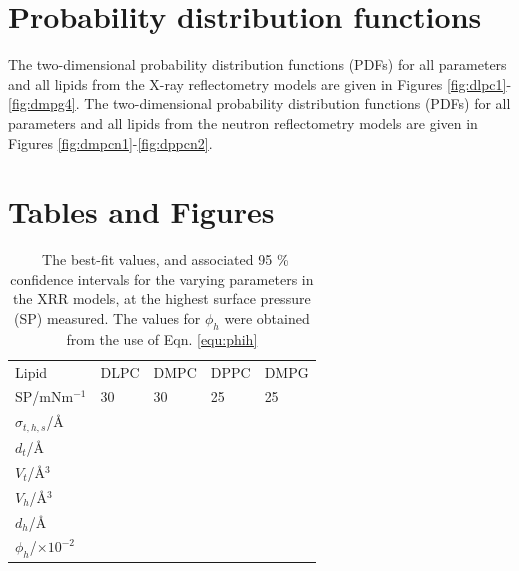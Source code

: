 \documentclass[amsmath,amssymb,superscriptaddress]{revtex4-1}
\begin{document}
\section{Probability distribution functions}
The two-dimensional probability distribution functions (PDFs) for all parameters and all lipids from the X-ray reflectometry models are given in Figures \ref{fig:dlpc1}-\ref{fig:dmpg4}.
The two-dimensional probability distribution functions (PDFs) for all parameters and all lipids from the neutron reflectometry models are given in Figures \ref{fig:dmpcn1}-\ref{fig:dppcn2}.

\section{Tables and Figures}

%
\begin{table}
  \centering
	\caption{\ The best-fit values, and associated 95 \% confidence intervals for the varying parameters in the XRR models, at the highest surface pressure (SP) measured. The values for $\phi_h$ were obtained from the use of Eqn. \ref{equ:phih}}
	\label{tab:liptab1}
	\begin{tabular}{l|l|l|l|l}
		Lipid & DLPC & DMPC & DPPC & DMPG \\
    SP/mNm$^{-1}$ & 30 & 30 & 25 & 25 \\
		\hline
		$\sigma_{t,h,s}$/\AA &  &  &  &  \\
    $d_t$/\AA &  &  &  &  \\
    \hline
    $V_t$/\AA$^3$ &  &  &  &  \\
		$V_h$/\AA$^3$ &  &  &  &  \\
		$d_h$/\AA &  &  &  &  \\
    \hline
    $\phi_h$/$\times10^{-2}$ &  &  &  &  \\
	\end{tabular}
\end{table}
\end{document}
